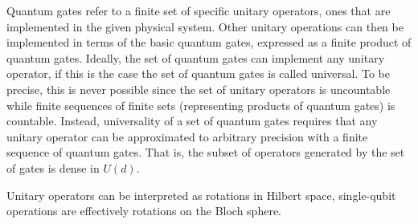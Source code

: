 Quantum gates refer to a finite set of specific unitary operators, ones that are implemented in the given physical system. Other unitary operations can then be implemented in terms of the basic quantum gates, expressed as a finite product of quantum gates. Ideally, the set of quantum gates can implement any unitary operator, if this is the case the set of quantum gates is called universal. To be precise, this is never possible since the set of unitary operators is uncountable while finite sequences of finite sets (representing products of quantum gates) is countable. Instead, universality of a set of quantum gates requires that any unitary operator can be approximated to arbitrary precision with a finite sequence of quantum gates. That is, the subset of operators generated by the set of gates is dense in $U(d)$.

Unitary operators can be interpreted as rotations in Hilbert space, single-qubit operations are effectively rotations on the Bloch sphere.

